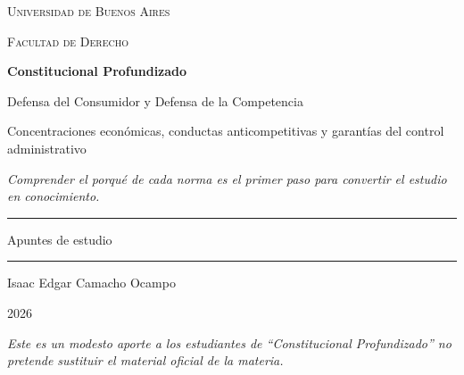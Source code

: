 \documentclass[12pt,oneside]{book}
\newcommand{\universidad}{Universidad de Buenos Aires}
\newcommand{\facultad}{Facultad de Derecho}
\newcommand{\materia}{Constitucional Profundizado}
\newcommand{\titulo}{Defensa del Consumidor y Defensa de la Competencia}
\newcommand{\subtitulo}{Concentraciones económicas, conductas anticompetitivas y garantías del control administrativo}
\newcommand{\autor}{Isaac Edgar Camacho Ocampo}
\newcommand{\anio}{2026}
\begin{document}
\begin{titlepage}

\thispagestyle{empty}

\begin{center}

\vspace*{1cm}

{\large \textsc{\universidad}}

\vspace{0.2cm}

{\large \textsc{\facultad}}

\vspace{3cm}

{\Huge \textbf{\materia}}

\vspace{1cm}

{\LARGE \titulo}

\vspace{0.4cm}

{\normalsize \subtitulo}

\vspace{0.8cm}

\textit{Comprender el porqué de cada norma es el primer paso para convertir el estudio en conocimiento.}

\vspace{1.2cm}

\rule{0.70\textwidth}{0.5pt}

\vspace{0.5cm}

{\large Apuntes de estudio}

\vspace{0.5cm}

\rule{0.70\textwidth}{0.5pt}

\vfill

{\large \autor}

\vspace{0.3cm}

{\large \anio}

\end{center}

\vfill

\begin{flushleft}
\textit{Este es un modesto aporte a los estudiantes de ``\materia'' no pretende sustituir el material oficial de la materia.}
\end{flushleft}

\end{titlepage}
\end{document}
